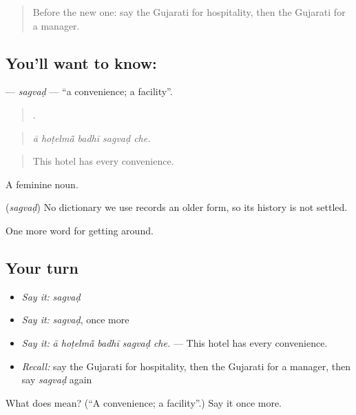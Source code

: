\begin{quote}
Before the new one: say the Gujarati for hospitality, then the Gujarati for a manager.
\end{quote}

\subsection*{You'll want to know: }
\textbf{} — \emph{sagvaḍ} — \textquotedblleft{}a convenience; a facility\textquotedblright{}.

\begin{quote}
    .
\end{quote}

\begin{quote}
\emph{ā hoṭelmā̃ badhī sagvaḍ che.}
\end{quote}

\begin{quote}
This hotel has every convenience.
\end{quote}

A feminine noun.

\begin{cousinweb}
\textbf{} (\emph{sagvaḍ}) No dictionary we use records an older form, so its history is not settled.
\end{cousinweb}

\begin{grammarlens}[title={What you've built}]
One more word for getting around.
\end{grammarlens}

\subsection*{Your turn}
\begin{itemize}
\raggedright
  \item \emph{Say it:} \emph{sagvaḍ}
  \item \emph{Say it:} \emph{sagvaḍ}, once more
  \item \emph{Say it:} \emph{ā hoṭelmā̃ badhī sagvaḍ che.} — This hotel has every convenience.
  \item \emph{Recall:} say the Gujarati for hospitality, then the Gujarati for a manager, then say \emph{sagvaḍ} again
\end{itemize}

\begin{tcolorbox}[breakable,colback=teal!4,colframe=teal!35!black,title={Before you move on}]
What does  mean? (\textquotedblleft{}A convenience; a facility\textquotedblright{}.) Say it once more.
\end{tcolorbox}
